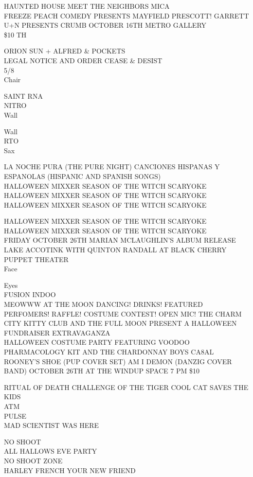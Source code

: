 \documentclass[10pt,letterpaper]{article}
\begin{document}
HAUNTED HOUSE MEET THE NEIGHBORS MICA\\
FREEZE PEACH COMEDY PRESENTS MAYFIELD PRESCOTT!  GARRETT\\
U+N PRESENTS CRUMB OCTOBER 16TH METRO GALLERY\\
\$10 TH

ORION SUN + ALFRED \& POCKETS\\
LEGAL NOTICE AND ORDER CEASE \& DESIST\\
5/8\\
Chair

SAINT RNA\\
NITRO\\
Wall

Wall\\
RTO\\
Sax

LA NOCHE PURA (THE PURE NIGHT) CANCIONES HISPANAS Y ESPANOLAS (HISPANIC AND SPANISH SONGS)\\
HALLOWEEN MIXXER SEASON OF THE WITCH SCARYOKE\\
HALLOWEEN MIXXER SEASON OF THE WITCH SCARYOKE\\
HALLOWEEN MIXXER SEASON OF THE WITCH SCARYOKE

HALLOWEEN MIXXER SEASON OF THE WITCH SCARYOKE\\
HALLOWEEN MIXXER SEASON OF THE WITCH SCARYOKE\\
FRIDAY OCTOBER 26TH MARIAN MCLAUGHLIN'S ALBUM RELEASE LAKE ACCOTINK WITH QUINTON RANDALL AT BLACK CHERRY PUPPET THEATER\\
Face

Eyes\\
FUSION INDOO\\
MEOWWW AT THE MOON DANCING!  DRINKS!  FEATURED PERFOMERS!  RAFFLE!  COSTUME CONTEST!  OPEN MIC!  THE CHARM CITY KITTY CLUB AND THE FULL MOON PRESENT A HALLOWEEN FUNDRAISER EXTRAVAGANZA\\
HALLOWEEN COSTUME PARTY FEATURING VOODOO PHARMACOLOGY KIT AND THE CHARDONNAY BOYS CA8AL ROONEY'S SHOE (PUP COVER SET) AM I DEMON (DANZIG COVER BAND) OCTOBER 26TH AT THE WINDUP SPACE 7 PM \$10

RITUAL OF DEATH CHALLENGE OF THE TIGER COOL CAT SAVES THE KIDS\\
ATM\\
PULSE\\
MAD SCIENTIST WAS HERE

NO SHOOT\\
ALL HALLOWS EVE PARTY\\
NO SHOOT ZONE\\
HARLEY FRENCH YOUR NEW FRIEND
\end{document}
